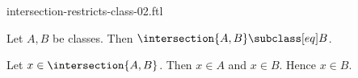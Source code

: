 \documentclass{article}
\begin{document}
\begin{smodule}[creators={Marcel Schütz}]{intersection-restricts-class-02.ftl}

  \begin{fproposition*}[label=8287827479494656]
    Let $A, B$ be classes.
    Then $\intersection{A,B} \subclass[eq] B$.
  \end{fproposition*}
  \begin{fproof}
    Let $x \in \intersection{A,B}$.
    Then $x \in A$ and $x \in B$.
    Hence $x \in B$.
  \end{fproof}
\end{smodule}
\end{document}
